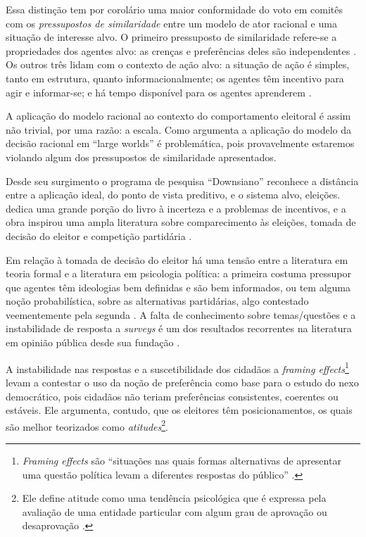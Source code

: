 Essa distinção tem por corolário uma maior conformidade do voto em comitês com
os \textit{pressupostos de similaridade} entre um modelo de ator racional e uma
situação de interesse alvo. O primeiro pressuposto de similaridade refere-se a
propriedades dos agentes alvo: as crenças e preferências deles são independentes
\cite{binmore2008rational}. Os outros três lidam com o contexto de ação alvo: a
situação de ação é simples, tanto em estrutura, quanto informacionalmente; os
agentes têm incentivo para agir e informar-se; e há tempo disponível para os
agentes aprenderem \cite{binmore2007work, page2008uncertainty}.

A aplicação do modelo racional ao contexto do comportamento eleitoral é assim
não trivial, por uma razão: a escala. Como argumenta 
a aplicação do modelo da decisão racional em  ``large worlds'' é problemática,
pois provavelmente estaremos violando algum dos pressupostos de similaridade
apresentados.

Desde seu surgimento o programa de pesquisa ``Downsiano'' reconhece a distância
entre a aplicação ideal, do ponto de vista preditivo, e o sistema alvo,
eleições.  dedica uma grande porção do livro à
incerteza e a problemas de incentivos, e a obra inspirou uma ampla literatura
sobre comparecimento às eleições, tomada de decisão do eleitor e competição
partidária \cite{bendor2011behavioral}.

Em relação à tomada de decisão do eleitor há uma tensão entre a literatura em
teoria formal e a literatura em psicologia política: a primeira costuma
pressupor que agentes têm ideologias bem definidas e são bem informados, ou tem
alguma noção probabilística, sobre as alternativas partidárias, algo contestado
veementemente pela segunda
\cite[p.5]{bendor2011behavioral}. A falta de conhecimento sobre temas/questões e
a instabilidade de resposta a
\textit{surveys} é um dos resultados recorrentes na literatura em opinião
pública desde sua fundação \cite{berelson1952democratic, converse2006nature,
  zaller1992simple, kuklinski2000misinformation}.

A instabilidade nas respostas e a suscetibilidade dos cidadãos a \textit{framing
  effects}\footnote{\textit{Framing effects} são ``situações nas quais formas
  alternativas de apresentar uma questão política levam a diferentes respostas
  do público'' \cite[p.56]{bartels2003democracy}.} levam
 a contestar o uso da noção de preferência como
base para o estudo do nexo democrático, pois cidadãos não teriam preferências
consistentes, coerentes ou estáveis. Ele argumenta, contudo, que os eleitores
têm posicionamentos, os quais são melhor teorizados como
\textit{atitudes}\footnote{ Ele define atitude como uma tendência psicológica
  que é expressa pela avaliação de uma entidade particular com algum grau de
  aprovação ou desaprovação \cite[p.52]{bartels2003democracy}.}.

